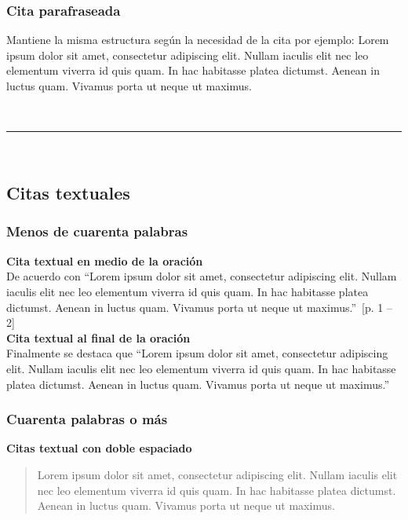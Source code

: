 \documentclass[stu, 12pt, letterpaper, donotrepeattitle, floatsintext, natbib]{apa7}
\begin{document}
\subsubsection{Cita parafraseada}
Mantiene la misma estructura según la necesidad de la cita por ejemplo:
Lorem ipsum dolor sit amet, consectetur adipiscing elit. Nullam iaculis elit nec leo elementum viverra id quis quam. In hac habitasse platea dictumst. Aenean in luctus quam. Vivamus porta ut neque ut maximus.  

\mbox{}\\ \hrule \mbox{}\\

\subsection{Citas textuales}
\subsubsection{Menos de cuarenta palabras}
\noindent \textbf{Cita textual en medio de la oración}\\
 De acuerdo con  ``Lorem ipsum dolor sit amet, consectetur adipiscing elit. Nullam iaculis elit nec leo elementum viverra id quis quam. In hac habitasse platea dictumst. Aenean in luctus quam. Vivamus porta ut neque ut maximus.''~[p. 1 -- 2]\\

\noindent \textbf{Cita textual al final de la oración}\\
Finalmente se destaca que ``Lorem ipsum dolor sit amet, consectetur adipiscing elit. Nullam iaculis elit nec leo elementum viverra id quis quam. In hac habitasse platea dictumst. Aenean in luctus quam. Vivamus porta ut neque ut maximus.'' \\

\subsubsection{Cuarenta palabras o más}
\noindent \textbf{Citas textual con doble espaciado}
\begin{quote}
Lorem ipsum dolor sit amet, consectetur adipiscing elit. Nullam iaculis elit nec leo elementum viverra id quis quam. In hac habitasse platea dictumst. Aenean in luctus quam. Vivamus porta ut neque ut maximus. 
\end{quote}
\end{document}
